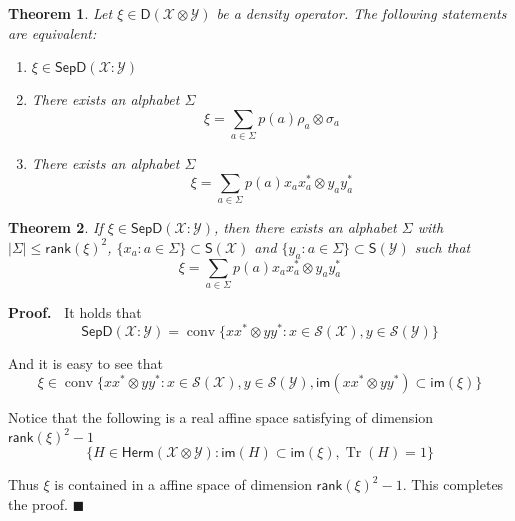 \documentclass[aps,pra,onecolumn,notitlepage,superscriptaddress]{revtex4-1}
\newcommand{\spc}[1]{\mathcal{#1}}
\newcommand{\Herm}{\mathsf{Herm}}
\newcommand{\D}{\mathsf{D}}
\newcommand{\s}{\mathsf{S}}
\newcommand{\SepD}{\mathsf{SepD}}
\newcommand{\rank}{\mathsf{rank}}
\newcommand{\im}{\mathsf{im}}
\newcommand{\Tr}{\operatorname{Tr}}
\newcommand{\op}[1]{\operatorname{#1}}
\newtheorem{theo}{Theorem}
\def\Proof{{\bf Proof.~}}
\def\qed{$\blacksquare$ \newline}
\begin{document}
    \begin{theo}
        Let $\xi \in \D(\spc X \otimes \spc Y)$ be a density operator. The following statements are equivalent:
        \begin{enumerate}
            \item $\xi \in \SepD(\spc X : \spc Y)$
            \item There exists an alphabet $\Sigma$
            \begin{equation}
                \xi = \sum_{a \in \Sigma} p(a) \rho_a \otimes \sigma_a
            \end{equation}
            \item There exists an alphabet $\Sigma$
            \begin{equation}
                \xi = \sum_{a \in \Sigma} p(a) x_ax_a^* \otimes y_ay_a^*
            \end{equation}
        \end{enumerate}
    \end{theo}

    \begin{theo}
        If $\xi \in \SepD(\spc X : \spc Y)$, then there exists an alphabet $\Sigma$ with $|\Sigma| \leq \rank(\xi)^2$, $\{ x_a : a \in \Sigma \} \subset \s(\spc X)$ and $\{ y_a : a \in \Sigma \} \subset \s(\spc Y)$ such that
        \begin{equation}
            \xi = \sum_{a \in \Sigma} p(a) x_ax_a^* \otimes y_ay_a^*
        \end{equation}
    \end{theo}
    \Proof
    It holds that
    \begin{equation}
        \SepD(\spc X : \spc Y) = \op{conv} \{ xx^* \otimes yy^* : x \in \spc S(\spc X), y \in \spc S(\spc Y) \}
    \end{equation}

    And it is easy to see that
    \begin{equation}
        \xi \in \op{conv} \{ xx^* \otimes yy^* : x \in \spc S(\spc X), y \in \spc S(\spc Y), \im(xx^* \otimes yy^*) \subset \im(\xi) \}
    \end{equation}

    Notice that the following is a real affine space satisfying of dimension $\rank(\xi)^2 - 1$
    \begin{equation}
        \{ H \in \Herm(\spc X \otimes \spc Y) : \im(H) \subset \im(\xi), \Tr(H) = 1 \}
    \end{equation}

    Thus $\xi$ is contained in a affine space of dimension $\rank(\xi)^2 - 1$. This completes the proof.
    \qed
\end{document}

